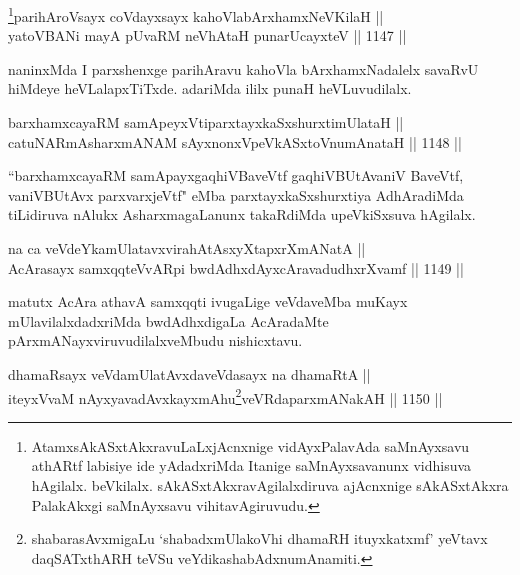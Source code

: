
\begin{shl}
\footnote{AtamxsAkASxtAkxravuLaLxjAcnxnige vidAyxPalavAda saMnAyxsavu athARtf labisiye ide yAdadxriMda Itanige saMnAyxsavanunx vidhisuva hAgilalx. beVkilalx. sAkASxtAkxravAgilalxdiruva ajAcnxnige sAkASxtAkxra PalakAkxgi saMnAyxsavu vihitavAgiruvudu.}parihAroV\s sayx coVdayxsayx kahoVlabArxhamxNeV\s KilaH || \\
yatoV\s BANi mayA pUvaRM neVhAtaH punarUcayxteV \hfill || 1147 ||  
\end{shl}

\begin{artha}
naninxMda I parxshenxge parihAravu kahoVla bArxhamxNadalelx savaRvU hiMdeye heVLalapxTiTxde. adariMda ililx punaH heVLuvudilalx.
\end{artha}


\begin{shl}
barxhamxcayaRM samApeyxVtiparxtayxkaSxshurxtimUlataH || \\
catuNARmAsharxmANAM sAyxnonxVpeVkASx\s toV\s numAnataH \hfill || 1148 ||  
\end{shl}

\begin{artha}
``barxhamxcayaRM samApayxgaqhiVBaveVtf gaqhiVBUtAvaniV BaveVtf, vaniVBUtAvx parxvarxjeVtf" eMba parxtayxkaSxshurxtiya AdhAradiMda tiLidiruva nAlukx AsharxmagaLanunx takaRdiMda upeVkiSxsuva hAgilalx.
\end{artha}

\begin{shl}
na ca veVdeYkamUlatavxvirahAtAsxyXtapxrXmANatA || \\
AcArasayx samxqqteVvAR\s pi bwdAdhxdAyxcAravadudhxrXvamf \hfill || 1149 ||  
\end{shl}

\begin{artha}
matutx AcAra athavA samxqqti ivugaLige veVdaveMba muKayx mUlavilalxdadxriMda bwdAdhxdigaLa AcAradaMte pArxmANayxviruvudilalxveMbudu nishicxtavu.
\end{artha}


\begin{shl}
dhamaRsayx veVdamUlatAvxdaveVdasayx na dhamaRtA ||  \\
iteyxVvaM nAyxyavadAvxkayxmAhu\footnote{shabarasAvxmigaLu `shabadxmUlakoVhi dhamaRH ituyxkatxmf' yeVtavx daqSATxthARH teVSu  veYdikashabAdxnumAnamiti.}veVRdaparxmANakAH \hfill || 1150 ||  
\end{shl}


